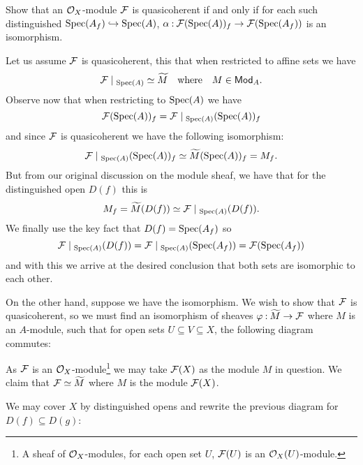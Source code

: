 \documentclass[12pt]{memoir}
\begin{document}
\begin{Ej}[6.2.D Vakil]
    Show that an $\mathcal{O}_X$-module $\mathcal{F}$ is quasicoherent if and only if for each such distinguished $\operatorname{Spec}(A_f)\hookrightarrow\operatorname{Spec}(A)$, $\alpha\mathbin{:}\mathcal{F}(\operatorname{Spec}(A))_f\to\mathcal{F}(\operatorname{Spec}(A_f))$ is an isomorphism.
\end{Ej}

\begin{ptcbr}
Let us assume $\mathcal{F}$ is quasicoherent, this that when restricted to affine sets we have 
$$\cF\mid_{\Spec(A)}\isom\widetilde{M}\word{where}M\in\cat{Mod}_A.$$
Observe now that when restricting to $\operatorname{Spec}(A)$ we have
$$\cF(\Spec(A))_f=\cF\mid_{\Spec(A)}(\Spec(A))_f$$
and since $\mathcal{F}$ is quasicoherent we have the following isomorphism:
$$\cF\mid_{\Spec(A)}(\Spec(A))_f\isom\widetilde{M}(\Spec(A))_f=M_f.$$
But from our original discussion on the module sheaf, we have that for the distinguished open $D(f)$ this is 
$$M_f=\widetilde{M}(D(f))\isom\cF\mid_{\Spec(A)}(D(f)).$$
We finally use the key fact that $D(f)=\operatorname{Spec}(A_f)$ so 
$$\cF\mid_{\Spec(A)}(D(f))=\cF\mid_{\Spec(A)}(\Spec(A_f))=\cF(\Spec(A_f))$$
and with this we arrive at the desired conclusion that both sets are isomorphic to each other.\par 
On the other hand, suppose we have the isomorphism. We wish to show that $\mathcal{F}$ is quasicoherent, so we must find an isomorphism of sheaves $\varphi\mathbin{:}\widetilde{M}\to\mathcal{F}$ where $M$ is an $A$-module, such that for open sets $U\subseteq V\subseteq X$, the following diagram commutes:
\begin{center}
\end{center}
As $\mathcal{F}$ is an $\mathcal{O}_X$-module\footnote{A sheaf of $\mathcal{O}_X$-modules, for each open set $U$, $\mathcal{F}(U)$ is an $\mathcal{O}_X(U)$-module.} we may take $\mathcal{F}(X)$ as the module $M$ in question. We claim that $\mathcal{F}\simeq\widetilde{M}$ where $M$ is the module $\mathcal{F}(X)$.\par 
We may cover $X$ by distinguished opens and rewrite the previous diagram for $D(f)\subseteq D(g)$: 

\end{ptcbr}
\end{document}
